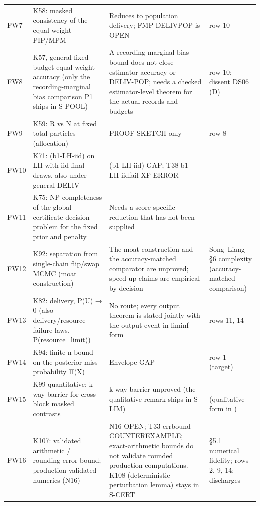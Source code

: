 {\begin{xltabular}{\textwidth}{@{}>{\raggedright\arraybackslash}p{1.25cm} >{\raggedright\arraybackslash}X >{\raggedright\arraybackslash}X >{\raggedright\arraybackslash}p{2.5cm}@{}}
 FW7 & K58: masked consistency of the equal-weight PIP/MPM & Reduces to population delivery; FMP-DELIVPOP is OPEN  & row 10 \\
 FW8 & K57, general fixed-budget equal-weight accuracy (only the recording-marginal bias comparison P1 ships in S-POOL) & A recording-marginal bias bound does not close estimator accuracy or DELIV-POP; needs a checked estimator-level theorem for the actual records and budgets  & row 10; dissent DS06 (D) \\
 FW9 & K59: R vs N at fixed total particles (allocation) & PROOF SKETCH only  & row 8 \\
 FW10 & K71: (b1-LH-iid) on LH with iid final draws, also under general DELIV & (b1-LH-iid) GAP; T38-b1-LH-iidfail XF ERROR  & --- \\
 FW11 & K75: NP-completeness of the global-certificate decision problem for the fixed prior and penalty & Needs a score-specific reduction that has not been supplied  & --- \\
 FW12 & K92: separation from single-chain flip/swap MCMC (moat construction) & The moat construction and the accuracy-matched comparator are unproved; speed-up claims are empirical by decision  & Song–Liang §6 complexity (accuracy-matched comparison) \\
 FW13 & K82: delivery, P(U) → 0 (also delivery/resource-failure laws, P(resource\_limit)) & No route; every output theorem is stated jointly with the output event in liminf form  & rows 11, 14 \\
 FW14 & K94: finite-n bound on the posterior-miss probability Π(X) & Envelope GAP  & row 1 (target) \\
 FW15 & K99 quantitative: k-way barrier for cross-block masked contrasts & k-way barrier unproved (the qualitative remark ships in S-LIM)  & --- (qualitative form in ) \\
 FW16 & K107: validated arithmetic / rounding-error bound; production validated numerics (N16) & N16 OPEN; T33-errbound COUNTEREXAMPLE; exact-arithmetic bounds do not validate rounded production computations. K108 (deterministic perturbation lemma) stays in S-CERT  & §5.1 numerical fidelity; rows 2, 9, 14; discharges  \\

\end{xltabular}}
